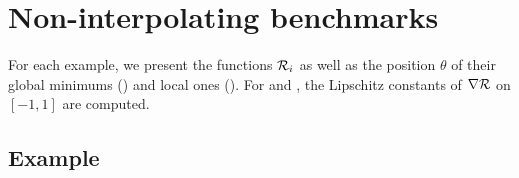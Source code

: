 \documentclass[article,authoryear,jmlmc]{beg_32}             %
\begin{document}
%
%		
%		
%		


\section{Non-interpolating benchmarks}
\label{annexe_non_interpolated}

For each example, we present the functions $\mathcal{R}_i$ as well as the position $\theta$ of their global minimums (\mg) and local ones (\ml). For \exOne and \exTwo, the Lipschitz constants of $\nabla \mathcal{R}$ on $[-1,1]$ are computed.

\subsection{Example \exOne}
~~\\
\end{document}

